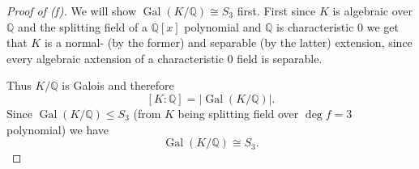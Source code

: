 \begin{proof}[Proof of (f)]
    We will show $\operatorname{Gal}(K/\mathbb Q) \cong 
    S_3$ first. 
    First since $K$ is algebraic over $\mathbb Q$ and 
    the splitting field of 
    a $\mathbb Q[x]$ polynomial and 
    $\mathbb Q$ is characteristic $0$ we get 
    that $K$ is a normal- (by the former) and 
    separable (by the latter) extension, since 
    every algebraic axtension of a characteristic $0$  
    field is separable.
    
    Thus $K/\mathbb Q$ is Galois and therefore 
    \[
        [K:\mathbb Q] = |\operatorname{Gal}(K/\mathbb Q)|. 
    \]
    Since $\operatorname{Gal}(K/\mathbb Q) \leq S_3$ (from $K$ being 
    splitting field over $\deg f = 3$ polynomial) we have 
    \[
        \operatorname{Gal}(K/\mathbb Q) \cong S_3.
    \]
\end{proof}

